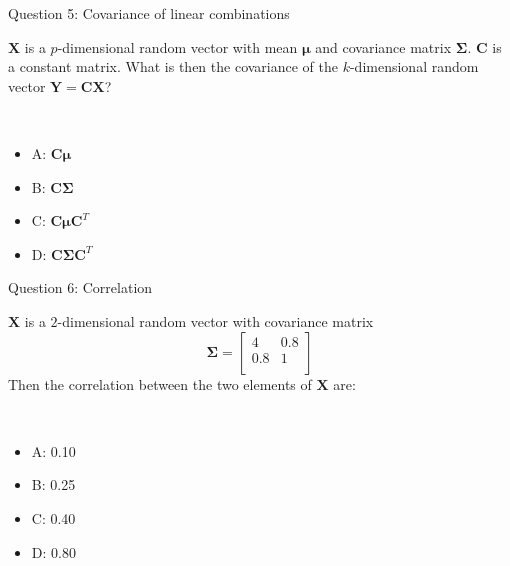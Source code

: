 \documentclass[
  ignorenonframetext,
]{beamer}
\providecommand{\tightlist}{%
  \setlength{\itemsep}{0pt}\setlength{\parskip}{0pt}}
\begin{document}
\begin{frame}
\begin{block}{Question 5: Covariance of linear combinations}
\protect\hypertarget{question-5-covariance-of-linear-combinations}{}
\vspace{2mm}

\(\boldsymbol{X}\) is a \(p\)-dimensional random vector with mean
\(\boldsymbol{\mu}\) and covariance matrix \(\boldsymbol\Sigma\).
\(\boldsymbol{C}\) is a constant matrix. What is then the covariance of
the \(k\)-dimensional random vector
\(\boldsymbol{Y}=\boldsymbol{C}\boldsymbol{X}\)?

\(~\)

\begin{itemize}
\tightlist
\item
  A: \(\boldsymbol{C}\boldsymbol{\mu}\)
\item
  B: \(\boldsymbol{C}\boldsymbol\Sigma\)
\item
  C: \(\boldsymbol{C}\boldsymbol{\mu}\boldsymbol{C}^T\)
\item
  D: \(\boldsymbol{C}\boldsymbol\Sigma\boldsymbol{C}^T\)
\end{itemize}
\end{block}
\end{frame}

\begin{frame}
\begin{block}{Question 6: Correlation}
\protect\hypertarget{question-6-correlation}{}
\vspace{2mm}

\(\boldsymbol{X}\) is a \(2\)-dimensional random vector with covariance
matrix \[ \boldsymbol\Sigma= \left[\begin{array}{cc}
          4 & 0.8 \\
          0.8 & 1\\
      \end{array}
    \right]\] Then the correlation between the two elements of
\(\boldsymbol{X}\) are:

\(~\)

\begin{itemize}
\tightlist
\item
  A: 0.10
\item
  B: 0.25
\item
  C: 0.40
\item
  D: 0.80
\end{itemize}
\end{block}
\end{frame}
\end{document}
